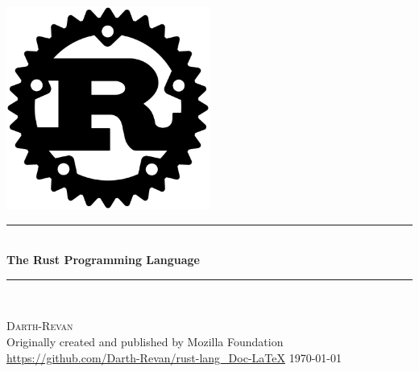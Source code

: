 \begin{titlepage}
\begin{center}

\vspace{1.5cm}
\includegraphics[width=0.5\textwidth]{src/Rust_Logo.png}\\[1cm]

\newcommand{\HRule}{\rule{\linewidth}{0.5mm}}

\HRule\\[1cm]
{\huge \bfseries The Rust Programming Language}\\[1cm]
\HRule\\
\vspace{3cm}

{\large
\textsc{Darth-Revan}\\[0.15cm]
Originally created and published by {Mozilla Foundation}\\[0.3cm]
\url{https://github.com/Darth-Revan/rust-lang_Doc-LaTeX}
}
\vfill
{\large \today}


\end{center}
\end{titlepage}
